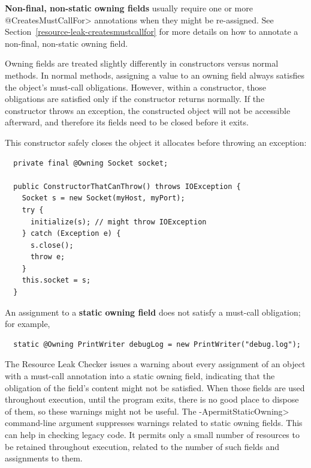 \textbf{Non-final, non-static owning fields} usually require one or more \<@CreatesMustCallFor> annotations
when they might be re-assigned. See Section~\ref{resource-leak-createsmustcallfor} for
more details on how to annotate a non-final, non-static owning field.

Owning fields are treated slightly differently in constructors versus normal methods.
In normal methods, assigning a value to an owning field always satisfies the object's
must-call obligations.  However, within a constructor, those obligations are
satisfied only if the constructor returns normally.  If the constructor throws an exception,
the constructed object will not be accessible afterward, and therefore its fields need
to be closed before it exits.

This constructor safely closes the object it allocates before throwing an exception:
\begin{verbatim}
  private final @Owning Socket socket;

  public ConstructorThatCanThrow() throws IOException {
    Socket s = new Socket(myHost, myPort);
    try {
      initialize(s); // might throw IOException
    } catch (Exception e) {
      s.close();
      throw e;
    }
    this.socket = s;
  }
\end{verbatim}

An assignment to a \textbf{static owning field} does not satisfy a
must-call obligation; for example,

\begin{smaller}
\begin{Verbatim}
  static @Owning PrintWriter debugLog = new PrintWriter("debug.log");
\end{Verbatim}
\end{smaller}

\noindent
The Resource Leak Checker issues a warning about every assignment of an
object with a must-call annotation into a static owning field,
indicating that the obligation of the field's content might not be
satisfied.  When those fields are used throughout execution, until the
program exits, there is no good place to dispose of them, so these warnings
might not be useful.  The \<-ApermitStaticOwning> command-line argument
suppresses warnings related to static owning fields.  This can help in
checking legacy code.  It permits only a small number of resources to be retained
throughout execution, related to the number of such fields and assignments
to them.



